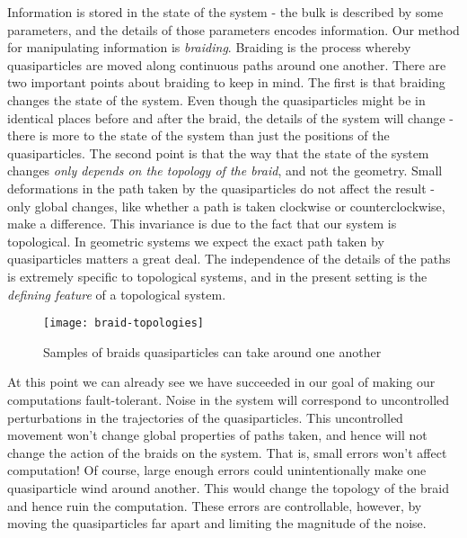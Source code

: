 Information is stored in the state of the system - the bulk is described by some parameters, and the details of those parameters encodes information. Our method for manipulating information is \textit{braiding}. Braiding is the process whereby quasiparticles are moved along continuous paths around one another. There are two important points about braiding to keep in mind. The first is that braiding changes the state of the system. Even though the quasiparticles might be in identical places before and after the braid, the details of the system will change - there is more to the state of the system than just the positions of the quasiparticles. The second point is that the way that the state of the system changes \textit{only depends on the topology of the braid}, and not the geometry. Small deformations in the path taken by the quasiparticles do not affect the result - only global changes, like whether a path is taken clockwise or counterclockwise, make a difference. This invariance is due to the fact that our system is topological. In geometric systems we expect the exact path taken by quasiparticles matters a great deal. The independence of the details of the paths is extremely specific to topological systems, and in the present setting is the \textit{defining feature} of a topological system.

\begin{figure}
\begin{center}
\texttt{[image: braid-topologies]}
\caption{Samples of braids quasiparticles can take around one another}
\label{fig:braid-topologies}
\end{center}
\end{figure}

At this point we can already see we have succeeded in our goal of making our computations fault-tolerant. Noise in the system will correspond to uncontrolled perturbations in the trajectories of the quasiparticles. This uncontrolled movement won’t change global properties of paths taken, and hence will not change the action of the braids on the system. That is, small errors won't affect computation! Of course, large enough errors could unintentionally make one quasiparticle wind around another. This would change the topology of the braid and hence ruin the computation. These errors are controllable, however, by moving the quasiparticles far apart and limiting the magnitude of the noise.

